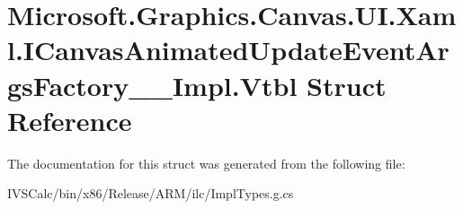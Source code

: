 \hypertarget{struct_microsoft_1_1_graphics_1_1_canvas_1_1_u_i_1_1_xaml_1_1_i_canvas_animated_update_event_args_factory_____impl_1_1_vtbl}{}\section{Microsoft.\+Graphics.\+Canvas.\+U\+I.\+Xaml.\+I\+Canvas\+Animated\+Update\+Event\+Args\+Factory\+\_\+\+\_\+\+Impl.\+Vtbl Struct Reference}
\label{struct_microsoft_1_1_graphics_1_1_canvas_1_1_u_i_1_1_xaml_1_1_i_canvas_animated_update_event_args_factory_____impl_1_1_vtbl}


The documentation for this struct was generated from the following file\+:\begin{DoxyCompactItemize}
\item 
I\+V\+S\+Calc/bin/x86/\+Release/\+A\+R\+M/ilc/Impl\+Types.\+g.\+cs\end{DoxyCompactItemize}
